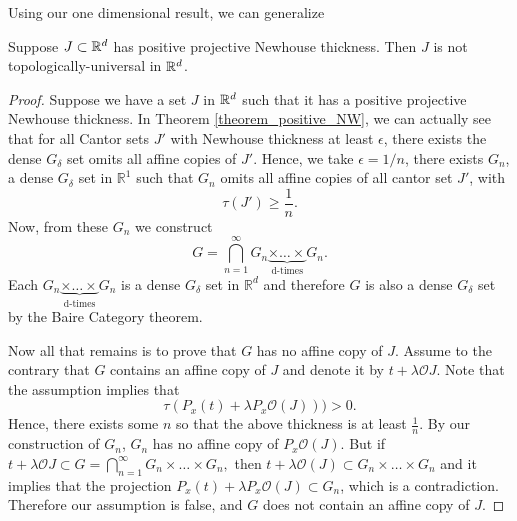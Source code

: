 
Using our one dimensional result, we can generalize 
\begin{theorem}Suppose $J \subset \mathbb{R}^d$ has positive projective Newhouse thickness. Then $J$ is not topologically-universal in $\mathbb{R}^d$.  
\end{theorem}

\begin{proof}  Suppose we have a set $J$ in $\mathbb{R}^d$ such that it has a positive projective Newhouse thickness. In Theorem \ref{theorem_positive_NW}, we can actually see that for all Cantor sets $J'$ with Newhouse thickness at least $\epsilon$, there exists the dense $G_{\delta}$ set  omits all affine copies of $J'$. Hence, we take $\epsilon = 1/n$,  there exists $G_n$, a dense $G_{\delta}$ set in ${\mathbb R}^1$ such that $G_n$ omits all affine copies of all cantor set $J'$, with $$\tau(J') \geq \frac{1}{n}.$$
Now, from these $G_n$ we construct
$$
G = \bigcap_{n=1}^\infty G_n\underbrace{\times \dots \times}_\text{d-times}G_n. 
$$
Each $G_n\underbrace{\times \dots \times}_\text{d-times}G_n $ is a dense $G_\delta$ set in ${\mathbb R}^d$ and therefore $G$ is also a dense $G_\delta$ set by the Baire Category theorem.  

Now all that remains is to prove that $G$ has no affine copy of $J$.   Assume to the contrary that $G$ contains an affine copy of $J$ and denote it by $t+\lambda \mathcal{O}J$. Note that the assumption implies that 
$$
\tau(P_x(t) + \lambda P_x\mathcal{O}(J)))> 0.
$$
Hence, there exists some $n$ so that the above thickness is at least $\frac{1}{n}.$ By our construction of $G_n$, $G_n$ has no affine copy of $P_x\mathcal{O}(J)$.  But if $t + \lambda \mathcal{O}J \subset G = \bigcap_{n=1}^\infty G_n \times \dots \times G_n,$ then $t+\lambda \mathcal{O}(J) \subset G_n \times \dots \times G_n$ and it implies that the projection $P_x(t) + \lambda P_x\mathcal{O}(J) \subset G_n$, which is a contradiction.  Therefore our assumption is false, and $G$ does not contain an affine copy of $J$.  
 





\end{proof}
